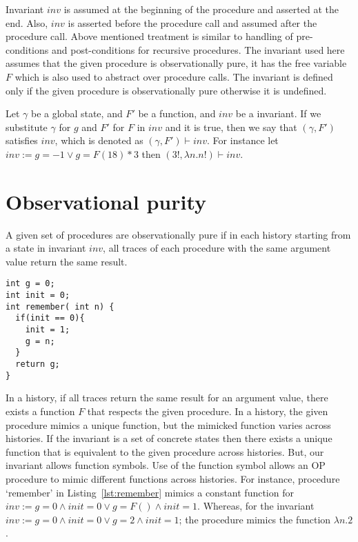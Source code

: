 \documentclass{llncs}
\newcommand{\inv}{\mathit{inv}}
\newcommand{\F}{\mathit{F}}
\newcommand{\gstate}{\gamma}
\newcommand{\satisfies}{\vdash}
\begin{document}
Invariant $\inv$ is assumed at the beginning of the procedure and
asserted at the end. Also, $\inv$ is asserted before the procedure
call and assumed after the procedure call. Above mentioned treatment
is similar to handling of pre-conditions and post-conditions for
recursive procedures. The invariant used here assumes that the given
procedure is observationally pure, it has the free variable $\F$ which
is also used to abstract over procedure calls. The invariant is
defined only if the given procedure is observationally pure otherwise
it is undefined.

Let $\gstate$ be a global state, and $\F'$ be a function, and $\inv$
be a invariant. If we substitute $\gstate$ for $g$ and $\F'$ for $\F$
in $\inv$ and it is true, then we say that $(\gstate, \F')$ satisfies
$\inv$, which is denoted as $(\gstate, \F') \satisfies \inv$. For
instance let $\inv := g = -1 \vee g = \F(18) * 3$ then $(3!, \lambda
n. n!) \satisfies \inv$.

\section{Observational purity}
\begin{definition}[observational purity(invariant $\inv$)]
 A given set of procedures are observationally pure if in each history
 starting from a state in invariant $\inv$, all traces of each
 procedure with the same argument value return the same result.
\end{definition}

\begin{lstlisting}[caption={Procedure `remember' : always returns the
      argument from its first call}, label=lst:remember]
int g = 0;
int init = 0;
int remember( int n) {
  if(init == 0){
    init = 1;
    g = n;
  }
  return g;
}
\end{lstlisting}

In a history, if all traces return the same result for an argument
value, there exists a function $\F$ that respects the given
procedure. In a history, the given procedure mimics a unique function,
but the mimicked function varies across histories. If the invariant is
a set of concrete states then there exists a unique function that is
equivalent to the given procedure across histories. But, our invariant
allows function symbols. Use of the function symbol allows an OP
procedure to mimic different functions across histories. For instance,
procedure `remember' in Listing~\ref{lst:remember} mimics a constant
function for $\inv := g=0 \wedge init=0 \vee g= \F() \wedge
init=1$. Whereas, for the invariant $\inv := g=0 \wedge init=0 \vee
g=2 \wedge init=1$; the procedure mimics the function $\lambda n.2$.
\end{document}
